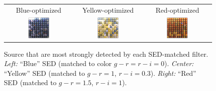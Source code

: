 \documentclass[11pt,letterpaper,linenumbers]{aastex63}
\begin{document}
\begin{figure}
  \begin{center}
    \begin{tabular}{@{}c@{}c@{}c@{}}
      Blue-optimized & Yellow-optimized & Red-optimized \\
      \includegraphics[width=0.33\textwidth]{best-blue} &
      \includegraphics[width=0.33\textwidth]{best-yellow} &
      \includegraphics[width=0.33\textwidth]{best-red}
    \end{tabular}
    \caption{Source that are most strongly detected by each
      SED-matched filter.  \emph{Left:} ``Blue'' SED (matched to color
      $g-r = r-i = 0$).  \emph{Center:} ``Yellow'' SED (matched to
      $g-r = 1$, $r-i = 0.3$).  \emph{Right:} ``Red'' SED (matched to
      $g-r = 1.5$, $r-i = 1$).
    \label{fig:bestsed}}
  \end{center}
\end{figure}
\end{document}
